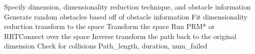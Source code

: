 \documentclass[12pt]{article}
\newcommand{\Function}[1]{\ensuremath{{\small \textsc{#1}}}}
\begin{document}

\begin{algorithm}[ht] 
    \caption{$\Function{Dimensionality Reduction}$}
    \label{alg:DR}
    \begin{algorithmic}[1]
        \setcounter{ALC@line}{0}
        \vspace*{1mm}

        \STATE Specify dimension, dimensionality reduction technique, and obstacle information
        \STATE Generate random obstacles based off of obstacle information
        \STATE Fit dimensionality reduction transform to the space
        \STATE Transform the space
        \STATE Run PRM* or RRTConnect over the space
        \STATE Inverse transform the path back to the original dimension
        \STATE Check for collisions
        \RETURN Path\_length, duration, num\_failed
    \end{algorithmic}
\end{algorithm}




\end{document}
